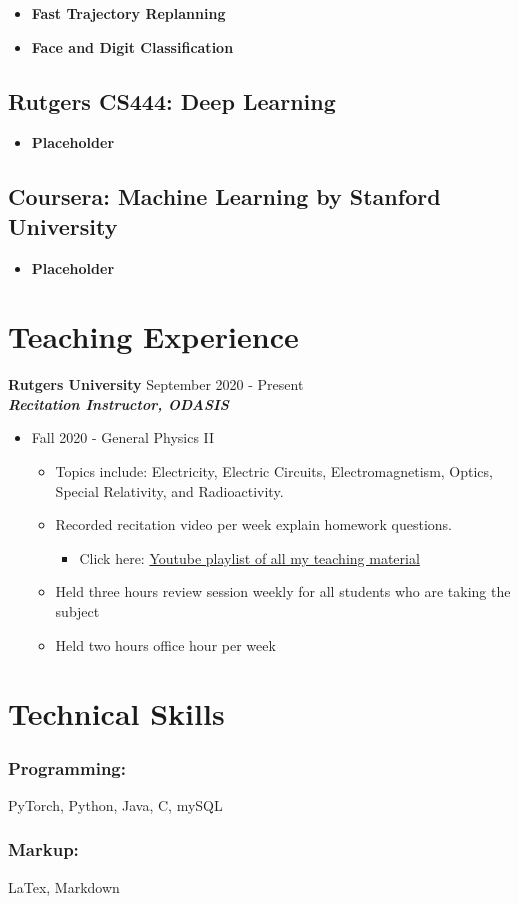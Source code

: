\documentclass{article}
\begin{document}
\begin{itemize}
  \itemsep0em
  \item \textbf{Fast Trajectory Replanning}\\
  \item \textbf{Face and Digit Classification}
\end{itemize}

\subsection*{Rutgers CS444: Deep Learning}

\begin{itemize}
  \itemsep0em
  \item \textbf{Placeholder}
\end{itemize}

\subsection*{Coursera: Machine Learning by Stanford University}
\begin{itemize}
  \itemsep0em
  \item \textbf{Placeholder}
\end{itemize}


\section{Teaching Experience}
\textbf{Rutgers University}
\hfill{September 2020 - Present}\\
\textit{\textbf{Recitation Instructor, ODASIS}}
\begin{itemize}
  \item Fall 2020 - General Physics II
  \begin{itemize}
  	\item Topics include: Electricity, Electric Circuits, Electromagnetism, Optics, Special Relativity, and Radioactivity.
     \item Recorded recitation video per week explain homework questions.
     \begin{itemize}
		\item Click here: \href{https://www.youtube.com/playlist?list=PLhDL674NFL2ggH1tSbZzek3hs83dwfa25}{Youtube playlist of all my teaching material}
     \end{itemize}
     \item Held three hours review session weekly for all students who are taking the subject
 	 \item Held two hours office hour per week
  \end{itemize}
\end{itemize}


\section{Technical Skills}

\subsubsection{Programming:}

PyTorch, Python, Java, C, mySQL

\subsubsection{Markup:}

LaTex, Markdown
\end{document}
